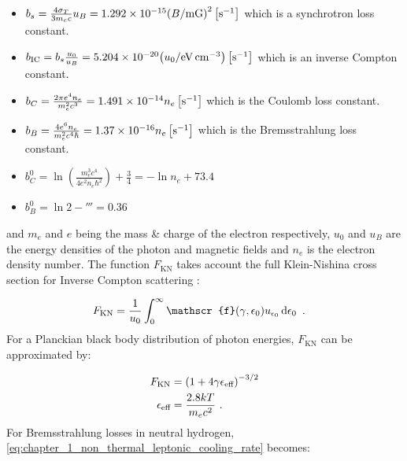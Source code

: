 \begin{itemize}[noitemsep]
	\item $b_s=\frac{4\sigma_T}{3m_ec}u_B=1.292\times 10^{-15}\qty(B/\si{\milli G})^2\,\qty[\persec]$ which is a synchrotron loss constant.
	\item $b_\text{IC}=b_s\frac{u_0}{u_B}=5.204\times 10^{-20}\qty(u_0/\si{\electronvolt\per\centi\meter\cubed})\,\qty[\persec]$ which is an inverse Compton constant.
	\item $b_C=\frac{2\pi e^4 n_e}{m_e^2 c^3}=1.491\times 10^{-14}n_e\,\qty[\persec]$ which is the Coulomb loss constant.
	\item $b_B=\frac{4e^6 n_e}{m_e^2c^4\hbar}=1.37\times 10^{-16}n_e\,\qty[\persec]$ which is the Bremsstrahlung loss constant.
	\item $b_C^0=\ln(\frac{m_e^3c^4}{4e^2n_e\hbar^2})+\frac{3}{4}=-\ln n_e+73.4$
	\item $b_B^0=\ln 2-\third=0.36$
\end{itemize}
\noindent and $m_e$ and $e$ being the mass \& charge of the electron respectively, $u_0$ and $u_B$ are the energy densities of the photon and magnetic fields and $n_e$ is the electron density number. The function $F_\text{KN}$ takes account the full Klein-Nishina cross section for Inverse Compton scattering \citep{2007A&A...474..689M}:

\begin{equation}
	\begin{split}
		F_\text{KN}&=\frac{1}{u_0}\int_{0}^\infty \mathscr{f}\qty(\gamma,\epsilon_0)u_{\epsilon_0}\dd{\epsilon_0} \text{ .}
	\end{split}
\end{equation}
\noindent For a Planckian black body distribution of photon energies, $F_\text{KN}$ can be approximated by:

\begin{equation}
    \begin{aligned}
    F_\text{KN}&=\qty(1+4\gamma \epsilon_\text{eff})^{-3/2} \\
    \epsilon_\text{eff}&=\frac{2.8kT}{m_ec^2}\text{ .}
    \end{aligned}
\end{equation}
\noindent For Bremsstrahlung losses in neutral hydrogen, \autoref{eq:chapter_1_non_thermal_leptonic_cooling_rate} becomes:

